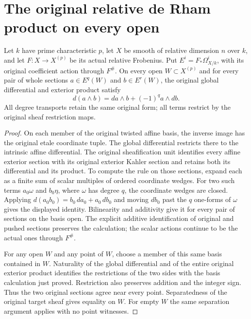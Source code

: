 \section{The original relative de Rham product on every open}

\begin{lemma}
\label{lem:native-di-all-open-wedge-leibniz}
\leanok
{}
Let $k$ have prime characteristic $p$, let $X$ be smooth of relative
 dimension $n$ over $k$, and let $F:X\to X^{(p)}$ be its actual
relative Frobenius. Put $E^i=F_*\Omega^i_{X/k}$, with its original
coefficient action through $F^\#$. On every open $W\subset X^{(p)}$
and for every pair of whole sections $a\in E^q(W)$ and $b\in E^r(W)$,
the original global differential and exterior product satisfy
\[
 d(a\wedge b)=da\wedge b+(-1)^q a\wedge db.
\]
All degree transports retain the same original form; all terms
restrict by the original sheaf restriction maps.
\end{lemma}
\begin{proof}
On each member of the original twisted affine basis, the inverse
image has the original etale coordinate tuple. The global differential
restricts there to the intrinsic affine differential. The original
sheafification unit identifies every affine exterior section with
its original exterior Kahler section and retains both its differential
and its product. To compute the rule on those sections, expand each
as a finite sum of scalar multiples of ordered coordinate wedges.
For two such terms $a_0\omega$ and $b_0\eta$, where $\omega$ has
degree $q$, the coordinate wedges are closed. Applying
$d(a_0b_0)=b_0\,da_0+a_0\,db_0$ and moving $db_0$ past the $q$
one-forms of $\omega$ gives the displayed identity. Bilinearity
and additivity give it for every pair of sections on the basis open.
The explicit additive identification of original and pushed sections
preserves the calculation; the scalar actions continue to be the
actual ones through $F^\#$.

For any open $W$ and any point of $W$, choose a member of this same
basis contained in $W$. Naturality of the global differential and of
the entire original exterior product identifies the restrictions of
the two sides with the basis calculation just proved. Restriction
also preserves addition and the integer sign. Thus the two original
sections agree near every point. Separatedness of the original target
sheaf gives equality on $W$. For empty $W$ the same separation
argument applies with no point witnesses.
\end{proof}
